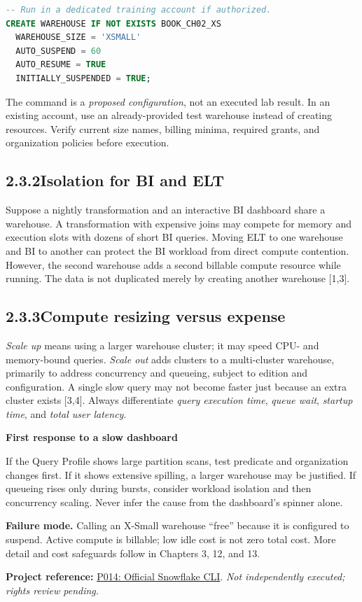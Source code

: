 \documentclass[11pt,twoside]{article}
\newcommand{\topic}[2]{\subsection*{#1\quad #2}}
\newcommand{\repo}[2]{\par\begingroup\fontsize{8.0}{9.6}\selectfont\sffamily\color{inkgray}\textbf{Project reference:} \href{#2}{#1}. \textit{Not independently executed; rights review pending.}\par\endgroup}
\begin{document}
\begin{lstlisting}[language=SQL,caption={Illustrative warehouse definition; execute only with approved privileges.}]
-- Run in a dedicated training account if authorized.
CREATE WAREHOUSE IF NOT EXISTS BOOK_CH02_XS
  WAREHOUSE_SIZE = 'XSMALL'
  AUTO_SUSPEND = 60
  AUTO_RESUME = TRUE
  INITIALLY_SUSPENDED = TRUE;
\end{lstlisting}
The command is a \emph{proposed configuration}, not an executed lab result. In an existing account, use an already-provided test warehouse instead of creating resources. Verify current size names, billing minima, required grants, and organization policies before execution.

\topic{2.3.2}{Isolation for BI and ELT}
Suppose a nightly transformation and an interactive BI dashboard share a warehouse. A transformation with expensive joins may compete for memory and execution slots with dozens of short BI queries. Moving ELT to one warehouse and BI to another can protect the BI workload from direct compute contention. However, the second warehouse adds a second billable compute resource while running. The data is not duplicated merely by creating another warehouse [1,3].

\topic{2.3.3}{Compute resizing versus expense}
\emph{Scale up} means using a larger warehouse cluster; it may speed CPU- and memory-bound queries. \emph{Scale out} adds clusters to a multi-cluster warehouse, primarily to address concurrency and queueing, subject to edition and configuration. A single slow query may not become faster just because an extra cluster exists [3,4]. Always differentiate \emph{query execution time}, \emph{queue wait}, \emph{startup time}, and \emph{total user latency}.

\begin{insight}
\textbf{First response to a slow dashboard}\par
If the Query Profile shows large partition scans, test predicate and organization changes first. If it shows extensive spilling, a larger warehouse may be justified. If queueing rises only during bursts, consider workload isolation and then concurrency scaling. Never infer the cause from the dashboard's spinner alone.
\end{insight}
\textbf{Failure mode.} Calling an X-Small warehouse ``free'' because it is configured to suspend. Active compute is billable; low idle cost is not zero total cost. More detail and cost safeguards follow in Chapters 3, 12, and 13.
\repo{P014: Official Snowflake CLI}{https://github.com/snowflakedb/snowflake-cli}
\end{document}

